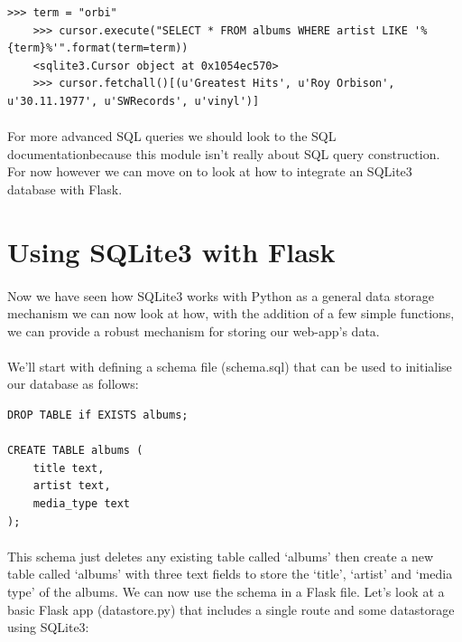 \documentclass[12pt, a4paper, oneside]{book}
\begin{document}
\begin{lstlisting}[style=DOS]
    >>> term = "orbi"
    >>> cursor.execute("SELECT * FROM albums WHERE artist LIKE '%{term}%'".format(term=term))
    <sqlite3.Cursor object at 0x1054ec570>
    >>> cursor.fetchall()[(u'Greatest Hits', u'Roy Orbison', u'30.11.1977', u'SWRecords', u'vinyl')]
\end{lstlisting}

\paragraph{} For more advanced SQL queries we should look to the SQL documentationbecause this module isn't really about SQL query construction. For now however we can move on to look at how to integrate an SQLite3 database with Flask.

\section{Using SQLite3 with Flask}
\label{sqlite3-flask}
\paragraph{} Now we have seen how SQLite3 works with Python as a general data storage mechanism we can now look at how, with the addition of a few simple functions, we can provide a robust mechanism for storing our web-app's data.

\paragraph{} We'll start with defining a schema file (schema.sql) that can be used to initialise our database as follows:

\begin{lstlisting}
DROP TABLE if EXISTS albums;

CREATE TABLE albums (
    title text,
    artist text,
    media_type text
);
\end{lstlisting}

\paragraph{} This schema just deletes any existing table called `albums' then create a new table called `albums' with three text fields to store the `title', `artist' and `media type' of the albums. We can now use the schema in a Flask file. Let's look at a basic Flask app (datastore.py) that includes a single route and some datastorage using SQLite3:
\end{document}
